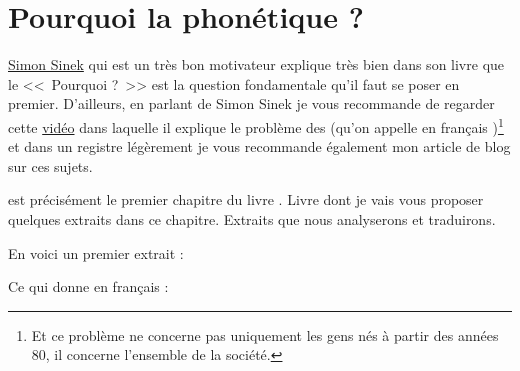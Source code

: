 \chapter{Pourquoi la phonétique ?}\label{chap:phonetic}

\href{https://fr.wikipedia.org/wiki/Simon_Sinek}{Simon Sinek} qui est
un très bon motivateur explique très bien dans son livre
\href{https://amzn.to/2qY8uMD}{} que le
<<~Pourquoi ?~>> est la question fondamentale qu'il faut se poser en
premier. D'ailleurs, en parlant de Simon Sinek je vous recommande de
regarder cette \href{https://youtu.be/hER0Qp6QJNU}{vidéo} dans
laquelle il explique le problème des  (qu'on appelle
en français )\footnote{Et ce problème ne
  concerne pas uniquement les gens nés à partir des années 80, il concerne
  l'ensemble de la société.} et dans un registre légèrement je vous
recommande également mon article de blog sur ces sujets.  

 est précisément le premier chapitre du livre
\lodge. Livre dont je vais vous proposer quelques extraits dans ce
chapitre. Extraits que nous analyserons et traduirons.

En voici un premier extrait :


\begin{center}
\begin{mdframed}[style=citestyle, frametitle={Extrait du livre \lodge}]
\end{mdframed}
\end{center}
  

Ce qui donne en français :

\begin{center}
\begin{mdframed}[style=tradstyle, frametitle={\exFR{Traduction} de l'extrait ci-dessus}]
\end{mdframed}  
\end{center}

